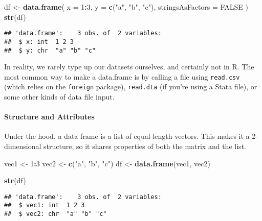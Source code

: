 \documentclass[
]{book}
\newenvironment{Shaded}{\begin{snugshade}}{\end{snugshade}}
\newcommand{\DataTypeTok}[1]{\textcolor[rgb]{0.13,0.29,0.53}{#1}}
\newcommand{\DecValTok}[1]{\textcolor[rgb]{0.00,0.00,0.81}{#1}}
\newcommand{\KeywordTok}[1]{\textcolor[rgb]{0.13,0.29,0.53}{\textbf{#1}}}
\newcommand{\NormalTok}[1]{#1}
\newcommand{\OperatorTok}[1]{\textcolor[rgb]{0.81,0.36,0.00}{\textbf{#1}}}
\newcommand{\OtherTok}[1]{\textcolor[rgb]{0.56,0.35,0.01}{#1}}
\newcommand{\StringTok}[1]{\textcolor[rgb]{0.31,0.60,0.02}{#1}}
\begin{document}
\begin{Shaded}
\begin{Highlighting}[]
\NormalTok{df \textless{}{-}}\StringTok{ }\KeywordTok{data.frame}\NormalTok{(}
  \DataTypeTok{x =} \DecValTok{1}\OperatorTok{:}\DecValTok{3}\NormalTok{,}
  \DataTypeTok{y =} \KeywordTok{c}\NormalTok{(}\StringTok{"a"}\NormalTok{, }\StringTok{"b"}\NormalTok{, }\StringTok{"c"}\NormalTok{),}
  \DataTypeTok{stringsAsFactors =} \OtherTok{FALSE}
\NormalTok{)}
\KeywordTok{str}\NormalTok{(df)}
\end{Highlighting}
\end{Shaded}

\begin{verbatim}
## 'data.frame':    3 obs. of  2 variables:
##  $ x: int  1 2 3
##  $ y: chr  "a" "b" "c"
\end{verbatim}

In reality, we rarely type up our datasets ourselves, and certainly not in R. The most common way to make a data.frame is by calling a file using \texttt{read.csv} (which relies on the \texttt{foreign} package), \texttt{read.dta} (if you're using a Stata file), or some other kinds of data file input.

\hypertarget{structure-and-attributes}{%
\paragraph{Structure and Attributes}\label{structure-and-attributes}}

Under the hood, a data frame is a list of equal-length vectors. This makes it a 2-dimensional structure, so it shares properties of both the matrix and the list.

\begin{Shaded}
\begin{Highlighting}[]
\NormalTok{vec1 \textless{}{-}}\StringTok{ }\DecValTok{1}\OperatorTok{:}\DecValTok{3}
\NormalTok{vec2 \textless{}{-}}\StringTok{ }\KeywordTok{c}\NormalTok{(}\StringTok{"a"}\NormalTok{, }\StringTok{"b"}\NormalTok{, }\StringTok{"c"}\NormalTok{)}
\NormalTok{df \textless{}{-}}\StringTok{ }\KeywordTok{data.frame}\NormalTok{(vec1, vec2)}

\KeywordTok{str}\NormalTok{(df)}
\end{Highlighting}
\end{Shaded}

\begin{verbatim}
## 'data.frame':    3 obs. of  2 variables:
##  $ vec1: int  1 2 3
##  $ vec2: chr  "a" "b" "c"
\end{verbatim}
\end{document}
